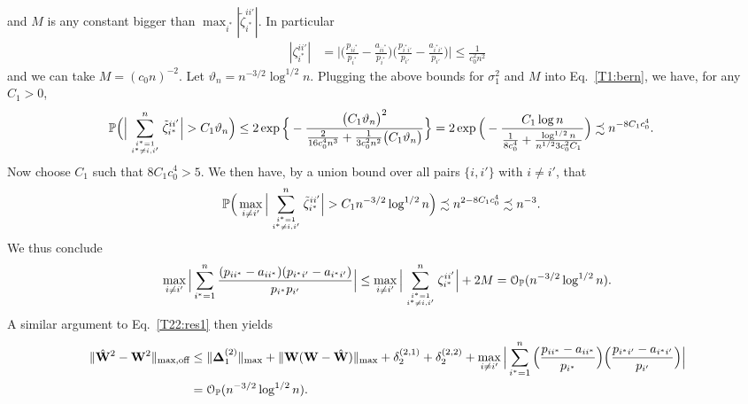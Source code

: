 \documentclass[10pt,journal,compsoc]{IEEEtran}
\newcommand{\op}{\mathcal{O}_{\mathbb{P}}}
\newcommand*{\p}{\mathbb{P}}
\newcommand{\ee}{\end{aligned} \end{equation}}
\newcommand{\BL}{\Big (}
\newcommand{\BR}{\Big )}
\newcommand{\MD}{\mathbf{\Delta}}
\newcommand{\bee}{\begin{equation}\begin{aligned}}
\newcommand{\M}[1]{{{\mathbf{\MakeUppercase{#1}}}}}
\numberwithin{equation}{section}
\begin{document}
and $M$ is any constant bigger than $\max_{i^*} |\tilde{\zeta}^{ii'}_{i^{*}}|$. In particular 
\bee\nonumber
|\zeta^{ii'}_{i^{*}}| &= \Big | \BL\frac{p_{ii^*}}{p_{i^*}} - \frac{a_{ii^*}}{p_{i^*}} \BR\BL\frac{p_{i^*i'}}{p_{i'}} - \frac{a_{i^{*}{i'}}}{p_{i'}} \BR\Big |
\leq \frac{1}{c_0^2n^2} 
\ee
and we can take $M = (c_0 n)^{-2}$. Let $\vartheta_n = n^{-3/2} \log^{1/2}{n}$.
Plugging the above bounds for $\sigma_1^2$ and $M$ into
Eq.~\eqref{T1:bern}, we have, for any $C_1 > 0$, 
\begin{equation*}
  \begin{split}
\p\Big(\Big|\sum_{i^* = 1\atop i^* \neq
  i,{i'}}^{n}\tilde{\zeta}^{ii'}_{i^{*}}\Big|>C_1 \vartheta_n \Big)
  &
\leq 2\exp\Big\{-\frac{\big(C_1 \vartheta_n\big)^2}{
  \frac{2}{16c_0^4n^3} +\frac{1}{3c_0^2 n^2}\big(C_1
  \vartheta_n\big)}\Big\}
= 2\exp\Big(-\frac{C_1\log n}{\frac{1}{8c_0^4}+\frac{\log^{1/2}{n}}{n^{1/2}3c_0^2C_1}}\Big)
\precsim n^{-8C_1c_0^4}.
\end{split}
\end{equation*}
Now choose $C_1$ such that $8C_1 c_0^4 > 5$. 
We then have, by a union bound over all pairs $\{i,i'\}$ with $i \not = i'$, that
\bee\nonumber
\p\Big(\max_{i \neq {i'}}\Big|\sum_{i^* = 1\atop i^* \neq
  i,{i'}}^{n}\tilde{\zeta}^{ii'}_{i^{*}}\Big|>C_1
n^{-3/2}\log^{1/2}{n}\Big)
&\precsim n^{2 - 8C_1c_0^4} 
\precsim n^{-3}.
\ee
We thus conclude
\begin{equation*}
  \begin{split}
\max_{i \neq {i'}}\Big|\sum_{i^{*}= 1}^{n}\frac{(p_{ii^*} - a_{ii^*})(p_{i^*i'} - a_{i^{*}{i'}})}{p_{i^*}p_{i'}} \Big|
\leq \max_{i \neq {i'}}\Big|
\sum_{i^* = 1\atop i^* \neq i,{i'}}^{n}\zeta^{ii'}_{i^{*}}
\Big| + 2 M 
= \op(n^{-3/2}\log^{1/2}{n}).
\end{split}
\end{equation*}
A similar argument to Eq.~\eqref{T22:res1} then yields
\bee\label{T22:res2}
\|\hat{\M W}^2 - \M W^2\|_{\max,\text{off}} 
& \leq \|\MD^{(2)}_1\|_{\max} + \|\M W(\M W - \hat{\M W})\|_{\max} + \delta^{(2,1)}_{2} + \delta^{(2,2)}_{2}  
+\max_{i \neq {i'}}\Big|\sum_{i^{*}=
  1}^{n}\BL\frac{p_{ii^*} - a_{ii^*}}{p_{i^*}}
\BR\BL\frac{p_{i^*i'} - a_{i^{*}{i'}}}{p_{i'}} \BR
\Big| 
\\
&=\op(n^{-3/2} \log^{1/2}{n}).
\ee
\end{document}
